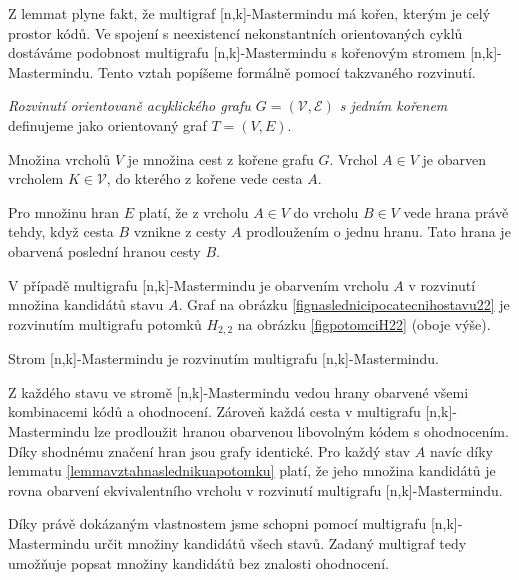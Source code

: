 Z lemmat plyne fakt, že multigraf [n,k]-Mastermindu má kořen, kterým je celý prostor kódů. Ve spojení s neexistencí nekonstantních orientovaných cyklů dostáváme podobnost multigrafu [n,k]-Mastermindu s kořenovým stromem [n,k]-Mastermindu. Tento vztah popíšeme formálně pomocí takzvaného rozvinutí.
\begin{definice}
    \emph{Rozvinutí orientovaně acyklického grafu $G = (\mathcal{V}, \mathcal{E})$ s jedním kořenem} definujeme jako orientovaný graf $T = (V, E)$.
    
    Množina vrcholů $V$ je množina cest z kořene grafu $G$. Vrchol $A \in V$ je obarven vrcholem $K \in \mathcal{V}$, do kterého z kořene vede cesta $A$. 
    
    Pro množinu hran $E$ platí, že z vrcholu $A \in V$ do vrcholu $B \in V$ vede hrana právě tehdy, když cesta $B$ vznikne z cesty $A$ prodloužením o jednu hranu. Tato hrana je obarvená poslední hranou cesty $B$. 
\end{definice}
V případě multigrafu [n,k]-Mastermindu je obarvením vrcholu $A$ v rozvinutí množina kandidátů stavu $A$. Graf na obrázku \ref{fignaslednicipocatecnihostavu22} je rozvinutím multigrafu potomků $H_{2,2}$ na obrázku \ref{figpotomciH22} (oboje výše).


\begin{veta}
    Strom [n,k]-Mastermindu je rozvinutím multigrafu [n,k]-Mastermindu.
\end{veta}
\begin{dukaz}
    Z každého stavu ve stromě [n,k]-Mastermindu vedou hrany obarvené všemi kombinacemi kódů a ohodnocení. Zároveň každá cesta v multigrafu [n,k]-Mastermindu lze prodloužit hranou obarvenou libovolným kódem s ohodnocením. Díky shodnému značení hran jsou grafy identické. Pro každý stav $A$ navíc díky lemmatu \ref{lemmavztahnaslednikuapotomku} platí, že jeho množina kandidátů je rovna obarvení ekvivalentního vrcholu v rozvinutí multigrafu [n,k]-Mastermindu.
    



\end{dukaz}
Díky právě dokázaným vlastnostem jsme schopni pomocí multigrafu [n,k]-Mastermindu určit množiny kandidátů všech stavů. Zadaný multigraf tedy umožňuje popsat množiny kandidátů bez znalosti ohodnocení. 

